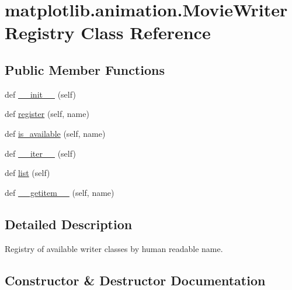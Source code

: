 \hypertarget{classmatplotlib_1_1animation_1_1MovieWriterRegistry}{}\section{matplotlib.\+animation.\+Movie\+Writer\+Registry Class Reference}
\label{classmatplotlib_1_1animation_1_1MovieWriterRegistry}
\subsection*{Public Member Functions}
\begin{DoxyCompactItemize}
\item 
def \hyperlink{classmatplotlib_1_1animation_1_1MovieWriterRegistry_abca077ac2f7825f1bf16b9a714373ccf}{\+\_\+\+\_\+init\+\_\+\+\_\+} (self)
\item 
def \hyperlink{classmatplotlib_1_1animation_1_1MovieWriterRegistry_ac12f67f0bba571be8edddca11a9a7dc7}{register} (self, name)
\item 
def \hyperlink{classmatplotlib_1_1animation_1_1MovieWriterRegistry_a7e6d3e2b7536f4bb23bfe5676e287e68}{is\+\_\+available} (self, name)
\item 
def \hyperlink{classmatplotlib_1_1animation_1_1MovieWriterRegistry_a5d51e567e8c4ca79e365d30266ea32b8}{\+\_\+\+\_\+iter\+\_\+\+\_\+} (self)
\item 
def \hyperlink{classmatplotlib_1_1animation_1_1MovieWriterRegistry_af1f0744495df6355be8f699e8dc8ad26}{list} (self)
\item 
def \hyperlink{classmatplotlib_1_1animation_1_1MovieWriterRegistry_a361a44f4b055423a6c1d37b4e4e67376}{\+\_\+\+\_\+getitem\+\_\+\+\_\+} (self, name)
\end{DoxyCompactItemize}


\subsection{Detailed Description}
\begin{DoxyVerb}Registry of available writer classes by human readable name.\end{DoxyVerb}
 

\subsection{Constructor \& Destructor Documentation}
\mbox{\label{classmatplotlib_1_1animation_1_1MovieWriterRegistry_abca077ac2f7825f1bf16b9a714373ccf}} 
